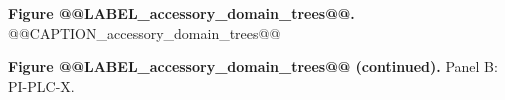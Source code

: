 \clearpage
{\large\textbf{Figure @@LABEL_accessory_domain_trees@@.} @@CAPTION_accessory_domain_trees@@\par}
{\textbf{Figure @@LABEL_accessory_domain_trees@@ (continued).} Panel B: PI-PLC-X.\par}


